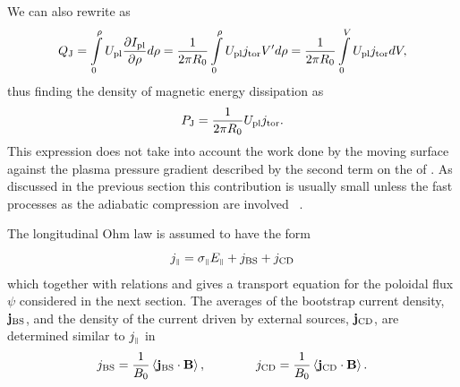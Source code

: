 We can also rewrite  as
\begin{equation}
\label{QJ}
Q_{\rm J}
=\int\limits_0^\rho U_{\rm pl}\displaystyle{\partial I_{\rm pl}\over\partial \rho}d\rho
=\frac{1}{2\pi R_0}\int\limits_0^\rho U_{\rm pl}j_{\rm tor}V'd\rho
=\frac{1}{2\pi R_0}\int\limits_0^V U_{\rm pl}j_{\rm tor}dV
,\end{equation}
thus finding the density of magnetic energy dissipation as
\begin{equation}\label{PJ}
P_{\rm J}=\frac{1}{2\pi R_0}U_{\rm pl}j_{\rm tor}
.\end{equation}
This expression does not take into account the work done by the moving
surface against the plasma pressure gradient described by the second
term on the \rhs of . 
As discussed in the previous section this contribution is usually small
unless the fast processes as the adiabatic compression are involved
~\cite{HH}. 

The longitudinal Ohm law is assumed to have the form
\begin{equation}\label{Ohm}
j_{\scriptscriptstyle\parallel}
=\sigma_{\scriptscriptstyle\parallel} E_{\scriptscriptstyle\parallel}+j_{\rm BS}+j_{\rm CD}
\end{equation}
which together with relations  and  gives a transport
equation for the poloidal flux $\psi$ considered in the next section.
The averages of the bootstrap current density, ${\bf j}_{\rm BS}$, and
the density of the current driven by external sources, ${\bf j}_{\rm
CD}$, are determined similar to $j_{\scriptscriptstyle\parallel}$ in  
\begin{equation}\label{jCD}
j_{\rm BS}=\displaystyle\frac{1}{B_0}\left<{\bf j}_{\rm BS}\cdot{\bf B}\right>
,\qquad\qquad
j_{\rm CD}=\displaystyle\frac{1}{B_0}\left<{\bf j}_{\rm CD}\cdot{\bf B}\right>
.\end{equation}




